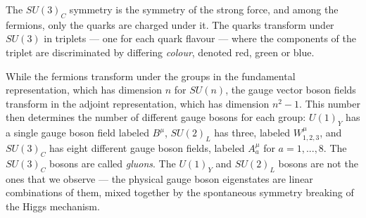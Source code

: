 \documentclass[twoside,english]{uiofysmaster}
\begin{document}
The $SU(3)_C$ symmetry is the symmetry of the strong force, and among the fermions, only the quarks are charged under it. The quarks transform under $SU(3)$ in triplets --- one for each quark flavour --- where the components of the triplet are discriminated by differing {\it colour}, denoted red, green or blue. 


While the fermions transform under the groups in the fundamental representation, which has dimension $n$ for $SU(n)$, the gauge vector boson fields transform in the adjoint representation, which has dimension $n^2-1$. This number then determines the number of different gauge bosons for each group: $U(1)_Y$ has a single gauge boson field labeled $B^\mu$, $SU(2)_L$ has three, labeled $W^\mu_{1,2,3}$, and $SU(3)_C$ has eight different gauge boson fields, labeled $A^\mu_a$ for $a = 1,...,8$. The $SU(3)_C$ bosons are called {\it gluons}. The $U(1)_Y$ and $SU(2)_L$ bosons are not the ones that we observe --- the physical gauge boson eigenstates are linear combinations of them, mixed together by the spontaneous symmetry breaking of the Higgs mechanism.
\end{document}
